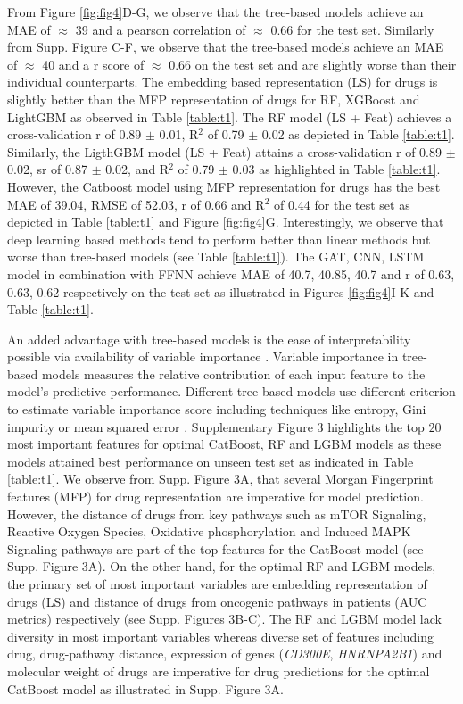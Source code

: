 \documentclass[pdflatex,sn-mathphys-num]{sn-jnl}%
\theoremstyle{thmstyleone}%
\theoremstyle{thmstyletwo}%
\theoremstyle{thmstylethree}%
\begin{document}
From Figure \ref{fig:fig4}D-G, we observe that the tree-based models achieve an MAE of $\approx$ 39 and a pearson correlation of $\approx$ 0.66 for the test set. Similarly from Supp. Figure C-F, we observe that the tree-based models achieve an MAE of $\approx$ 40 and a r score of $\approx$ 0.66 on the test set and are slightly worse than their individual counterparts. The embedding based representation (LS) for drugs is slightly better than the MFP representation of drugs for RF, XGBoost and LightGBM as observed in Table \ref{table:t1}. The RF model (LS + Feat) achieves a cross-validation r of 0.89 $\pm$ 0.01, R$^2$ of 0.79 $\pm$ 0.02 as depicted in Table \ref{table:t1}. Similarly, the LigthGBM model (LS + Feat) attains a cross-validation r of 0.89 $\pm$ 0.02, sr of 0.87 $\pm$ 0.02, and R$^2$ of 0.79 $\pm$ 0.03 as highlighted in Table \ref{table:t1}. However, the Catboost model using MFP representation for drugs has the best MAE of 39.04, RMSE of 52.03, r of 0.66 and R$^2$ of 0.44 for the test set as depicted in Table \ref{table:t1} and Figure \ref{fig:fig4}G. Interestingly, we observe that deep learning based methods tend to perform better than linear methods but worse than tree-based models (see Table \ref{table:t1}). The GAT, CNN, LSTM model in combination with FFNN achieve MAE of 40.7, 40.85, 40.7 and r of 0.63, 0.63, 0.62 respectively on the test set as illustrated in Figures \ref{fig:fig4}I-K and Table \ref{table:t1}. 

An added advantage with tree-based models is the ease of interpretability possible via availability of variable importance \cite{mall2018rgbm}. Variable importance in tree-based models measures the relative contribution of each input feature to the model's predictive performance. Different tree-based models use different criterion to estimate variable importance score including techniques like entropy, Gini impurity or mean squared error \cite{louppe2013understanding}. Supplementary Figure 3 highlights the top $20$ most important features for optimal CatBoost, RF and LGBM models as these models attained best performance on unseen test set as indicated in Table \ref{table:t1}. We observe from Supp. Figure 3A, that several Morgan Fingerprint features (MFP) for drug representation are imperative for model prediction. However, the distance of drugs from key pathways such as mTOR Signaling, Reactive Oxygen Species, Oxidative phosphorylation and Induced MAPK Signaling pathways are part of the top features for the CatBoost model (see Supp. Figure 3A). On the other hand, for the optimal RF and LGBM models, the primary set of most important variables are embedding representation of drugs (LS) and distance of drugs from oncogenic pathways in patients (AUC metrics) respectively (see Supp. Figures 3B-C). The RF and LGBM model lack diversity in most important variables whereas diverse set of features including drug, drug-pathway distance, expression of genes (\textit{CD300E}, \textit{HNRNPA2B1}) and molecular weight of drugs are imperative for drug predictions for the optimal CatBoost model as illustrated in Supp. Figure 3A.
\end{document}
